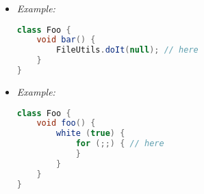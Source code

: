 \begin{itemize}
	\item {}
{\it Example:}
\begin{lstlisting}[language=Java]
class Foo {
	void bar() {
		FileUtils.doIt(null); // here
	}
}
\end{lstlisting}

	\item {}
{\it Example:}
\begin{lstlisting}[language=Java]
class Foo {
	void foo() {
		white (true) {
			for (;;) { // here
			}
		}
	}
}
\end{lstlisting}

\end{itemize}
